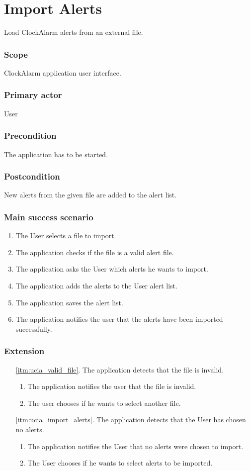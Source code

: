 \section{Import Alerts}\label{subsec:usecase_import_alerts}
Load ClockAlarm alerts from an external file.
\subsubsection{Scope}
ClockAlarm application user interface.
\subsubsection{Primary actor}
User
\subsubsection{Precondition}
The application has to be started.
\subsubsection{Postcondition}
New alerts from the given file are added to the alert list.
\subsubsection{Main success scenario}
\begin{enumerate}
	\item The User selects a file to import.
	\item\label{itm:ucia_valid_file} The application checks if the file is a valid alert file.
	\item\label{itm:ucia_import_alerts} The application asks the User which alerts he wants to import.
	\item The application adds the alerts to the User alert list.
	\item The application saves the alert list.
	\item The application notifies the user that the alerts have been imported successfully.
\end{enumerate}
\subsubsection{Extension}
\begin{enumerate}
	\item[\ref{itm:ucia_valid_file}.] The application detects that the file is invalid.
	\begin{enumerate}[i]
		\item The application notifies the user that the file is invalid.
		\item The user chooses if he wants to select another file.
	\end{enumerate}
	\item[\ref{itm:ucia_import_alerts}.] The application detects that the User has chosen no alerts.
	\begin{enumerate}[i]
		\item The application notifies the User that no alerts were chosen to import.
		\item The User chooses if he wants to select alerts to be imported.
	\end{enumerate}
\end{enumerate}
